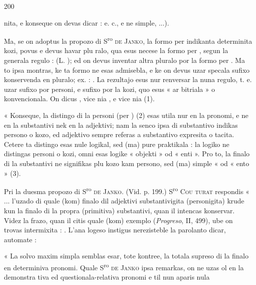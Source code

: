 \begin{VUpage}[204]{200}

\VUcontinue
nita, e konseque on devas dicar : \nl
{} e. c., e ne simple, ...).

Ma, se on adoptus la propozo di S\textsuperscript{ro} \textsc{de Janko}, la formo\nl
per  indikanta determinita kozi, povus e devus havar plu\cc
ralo, qua esus necese la formo per , segun la generala\nl
regulo :  (L. ); ed on devus inventar\nl
altra pluralo por la formo per . Ma to ipsa montras, ke\nl
ta formo ne esas admisebla, e ke on devus uzar specala\nl
sufixo konservenda en pluralo; ex. : . La\nl
rezultajo esus nur renversar la nuna regulo, t. e. uzar \nl
sufixo por personi, e  sufixo por la kozi, quo esus « ar\cc
bitriala » o konvencionala. On dicus , vice\nl
nia , e  vice nia  (1).

« Konseque, la distingo di la personi (per ) (2) esas\nl
utila nur en la pronomi, e ne en la substantivi nek en la\nl
adjektivi; nam la senco ipsa di substantivo indikas persono\nl
o kozo, ed adjektivo sempre referas a substantivo expresita\nl
o tacita. Cetere ta distingo esas nule logikal, sed (ma) pure\nl
praktikala : la logiko ne distingas personi o kozi, omni esas\nl
logike « objekti » od « enti ». Pro to, la finalo  di la\nl
substantivi ne signifikas plu kozo kam persono, sed (ma)\nl
simple «  od « ento » (3).

Pri la duesma propozo di S\textsuperscript{ro} \textsc{de Janko}. (Vid. p. 199.) S\textsuperscript{ro} \textsc{Cou}\cc
\textsc{turat} respondis « ... l'uzado di  quale (kom) finalo dil\nl
adjektivi substantivigita (personigita)  krude kun\nl
la finalo  di la propra (primitiva) substantivi, quan il\nl
intencas konservar. Videz la frazo, quan il citis quale (kom)\nl
exemplo (\textit{Progreso}, II, 499), ube on trovas intermixita :\nl
{}. L'ana\cc
logeso instigus nerezisteble la parolanto dicar, automate :\nl
{}

« La solvo maxim simpla semblas esar, tote kontree, la\nl
totala supreso di la finalo  en determiniva pronomi. Quale\nl
S\textsuperscript{ro} \textsc{de Janko} ipsa remarkas, on ne uzas ol en la demonstra\cc
tiva ed questionala-relativa pronomi e til nun aparis nula\nl
\end{VUpage}

